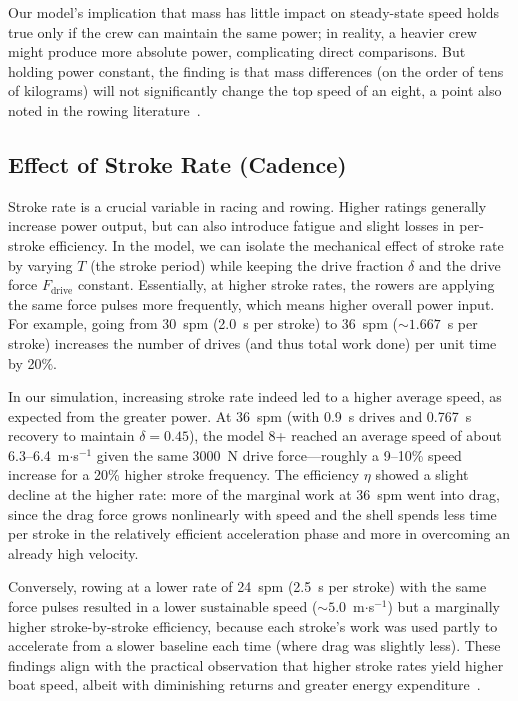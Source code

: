 \documentclass[12pt]{article}
\begin{document}
Our model’s implication that mass has little impact on steady-state speed holds true only if the crew can maintain the same power; in reality, a heavier crew might produce more absolute power, complicating direct comparisons. But holding power constant, the finding is that mass differences (on the order of tens of kilograms) will not significantly change the top speed of an eight, a point also noted in the rowing literature~\cite{celentano1974, kerr1998}.


\subsection{Effect of Stroke Rate (Cadence)}

Stroke rate is a crucial variable in racing and rowing. Higher ratings generally increase power output, but can also introduce fatigue and slight losses in per-stroke efficiency. In the model, we can isolate the mechanical effect of stroke rate by varying $T$ (the stroke period) while keeping the drive fraction $\delta$ and the drive force $F_{\text{drive}}$ constant. Essentially, at higher stroke rates, the rowers are applying the same force pulses more frequently, which means higher overall power input. For example, going from 30~spm (2.0~s per stroke) to 36~spm ($\sim1.667$~s per stroke) increases the number of drives (and thus total work done) per unit time by 20\%.

In our simulation, increasing stroke rate indeed led to a higher average speed, as expected from the greater power. At 36~spm (with 0.9~s drives and 0.767~s recovery to maintain $\delta = 0.45$), the model 8+ reached an average speed of about 6.3--6.4~m$\cdot$s$^{-1}$ given the same 3000~N drive force—roughly a 9--10\% speed increase for a 20\% higher stroke frequency. The efficiency \texorpdfstring{$\eta$}{eta} showed a slight decline at the higher rate: more of the marginal work at 36~spm went into drag, since the drag force grows nonlinearly with speed and the shell spends less time per stroke in the relatively efficient acceleration phase and more in overcoming an already high velocity.

Conversely, rowing at a lower rate of 24~spm (2.5~s per stroke) with the same force pulses resulted in a lower sustainable speed ($\sim5.0$~m$\cdot$s$^{-1}$) but a marginally higher stroke-by-stroke efficiency, because each stroke’s work was used partly to accelerate from a slower baseline each time (where drag was slightly less). These findings align with the practical observation that higher stroke rates yield higher boat speed, albeit with diminishing returns and greater energy expenditure~\cite{sandersonmartindale1986, smithloschner2002}. 
\end{document}

